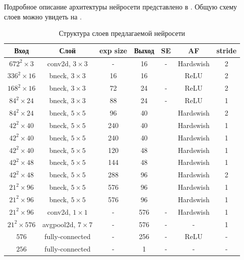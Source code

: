 Подробное описание архитектуры нейросети представлено в . Общую схему слоев можно увидеть на . 

\begin{table}[!htbp]
	\centering
	\small
	\begin{tabular}{|c|c|c|c|c|c|c|}
		\hline
		Вход & Слой & exp size & Выход & SE & AF & stride\\ \hline
		$672^2 \times 3$ & conv2d, $3 \times 3$ & - & 16 & - & Hardswish & 2\\ \hline
		$336^2 \times 16$ & bneck, $3 \times 3$ & 16 & 16 & \checkmark & ReLU & 2\\ \hline
		$168^2 \times 16$ & bneck, $3 \times 3$ & 72 & 24 & - & ReLU & 2\\ \hline
		$84^2 \times 24$ & bneck, $3 \times 3$ & 88 & 24 & - & ReLU & 1\\ \hline
		$84^2 \times 24$ & bneck, $5 \times 5$ & 96 & 40 & \checkmark & Hardswish & 2\\ \hline
		$42^2 \times 40$ & bneck, $5 \times 5$ & 240 & 40 & \checkmark & Hardswish & 1\\ \hline
		$42^2 \times 40$ & bneck, $5 \times 5$ & 240 & 40 & \checkmark & Hardswish & 1\\ \hline
		$42^2 \times 40$ & bneck, $5 \times 5$ & 120 & 48 & \checkmark & Hardswish & 1\\ \hline
		$42^2 \times 48$ & bneck, $5 \times 5$ & 144 & 48 & \checkmark & Hardswish & 1\\ \hline
		$42^2 \times 48$ & bneck, $5 \times 5$ & 288 & 96 & \checkmark & Hardswish & 2\\ \hline
		$21^2 \times 96$ & bneck, $5 \times 5$ & 576 & 96 & \checkmark & Hardswish & 1\\ \hline
		$21^2 \times 96$ & bneck, $5 \times 5$ & 576 & 96 & \checkmark & Hardswish & 1\\ \hline
		$21^2 \times 96$ & conv2d, $1 \times 1$ & - & 576 & - & Hardswish & 1\\ \hline
		$21^2 \times 576$ & avgpool2d, $7 \times 7$ & - & 576 & - & - & 1\\ \hline
		$576$ & fully-connected & - & 256 & - & ReLU & -\\ \hline
		$256$ & fully-connected & - & 1 & - & - & -\\ \hline
	\end{tabular}
	\caption{Структура слоев предлагаемой нейросети}
	\label{tab:nn_architecture}	
\end{table}

